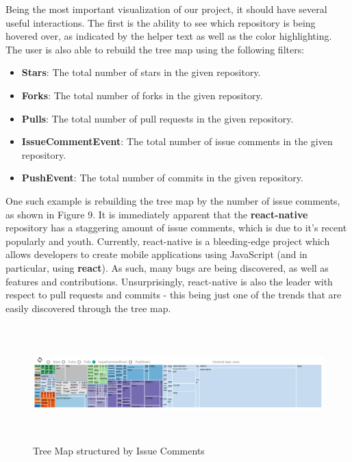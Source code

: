 \documentclass{article}
\begin{document}
Being the most important visualization of our project, it should have several useful interactions. The first is the ability to see which repository is being hovered over, as indicated by the helper text as well as the color highlighting. The user is also able to rebuild the tree map using the following filters:

\begin {itemize}
	\item \textbf{Stars}: The total number of stars in the given repository.
	\item \textbf{Forks}: The total number of forks in the given repository.
	\item \textbf{Pulls}: The total number of pull requests in the given repository.
	\item \textbf{IssueCommentEvent}: The total number of issue comments in the given repository.
	\item \textbf{PushEvent}: The total number of commits in the given repository.
\end {itemize}

One such example is rebuilding the tree map by the number of issue comments, as shown in Figure 9. It is immediately apparent that the \textbf{react-native} repository has a staggering amount of issue comments, which is due to it's recent popularly and youth. Currently, react-native is 
a bleeding-edge project which allows developers to create mobile applications using JavaScript (and in particular, using \textbf{react}). As such, many bugs are being discovered, as well as features and contributions. Unsurprisingly, react-native is also the leader with respect to pull requests and commits - this being just one of the trends that are easily discovered through the tree map.

\newpage

\begin{figure}[h!]
\centering
\includegraphics[height=4.5cm, width=17cm]{comment}
\caption{Tree Map structured by Issue Comments}
\end{figure}
\end{document}
